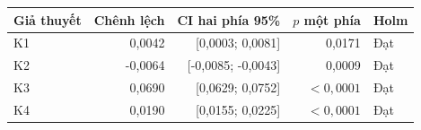 \begin{tabularx}{\textwidth}{@{}Yrrrl@{}}
\hline
Giả thuyết & Chênh lệch & CI hai phía 95\% & $p$ một phía & Holm \\\hline
K1 & 0,0042 & [0,0003; 0,0081] & 0,0171 & Đạt \\
K2 & -0,0064 & [-0,0085; -0,0043] & 0,0009 & Đạt \\
K3 & 0,0690 & [0,0629; 0,0752] & $<0{,}0001$ & Đạt \\
K4 & 0,0190 & [0,0155; 0,0225] & $<0{,}0001$ & Đạt \\
\hline
\end{tabularx}
